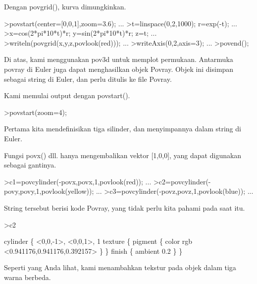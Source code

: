 \documentclass{article}
\begin{document}
\begin{eulernotebook}
\begin{eulercomment}
\begin{eulercomment}
\begin{eulercomment}
\begin{eulercomment}
\begin{eulercomment}
\begin{eulercomment}
\begin{eulercomment}
\begin{eulercomment}
\begin{eulercomment}
\begin{eulercomment}
\begin{eulercomment}
\begin{eulercomment}
\begin{eulercomment}
\begin{eulercomment}
\begin{eulercomment}
\begin{eulercomment}
\begin{eulerprompt}
\end{eulerprompt}
\begin{eulercomment}
Dengan povgrid(), kurva dimungkinkan.
\end{eulercomment}
\begin{eulerprompt}
>povstart(center=[0,0,1],zoom=3.6); ...
>t=linspace(0,2,1000); r=exp(-t); ...
>x=cos(2*pi*10*t)*r; y=sin(2*pi*10*t)*r; z=t; ...
>writeln(povgrid(x,y,z,povlook(red))); ...
>writeAxis(0,2,axis=3); ...
>povend();
\end{eulerprompt}
\begin{eulercomment}
Di atas, kami menggunakan pov3d untuk memplot permukaan. Antarmuka
povray di Euler juga dapat menghasilkan objek Povray. Objek ini
disimpan sebagai string di Euler, dan perlu ditulis ke file Povray.

Kami memulai output dengan povstart().
\end{eulercomment}
\begin{eulerprompt}
>povstart(zoom=4);
\end{eulerprompt}
\begin{eulercomment}
Pertama kita mendefinisikan tiga silinder, dan menyimpannya dalam
string di Euler.

Fungsi povx() dll. hanya mengembalikan vektor [1,0,0], yang dapat
digunakan sebagai gantinya.
\end{eulercomment}
\begin{eulerprompt}
>c1=povcylinder(-povx,povx,1,povlook(red)); ...
>c2=povcylinder(-povy,povy,1,povlook(yellow)); ...
>c3=povcylinder(-povz,povz,1,povlook(blue)); ...
\end{eulerprompt}
\begin{eulercomment}
String tersebut berisi kode Povray, yang tidak perlu kita pahami pada
saat itu.
\end{eulercomment}
\begin{eulerprompt}
>c2
\end{eulerprompt}
\begin{euleroutput}
  cylinder \{ <0,0,-1>, <0,0,1>, 1
   texture \{ pigment \{ color rgb <0.941176,0.941176,0.392157> \}  \} 
   finish \{ ambient 0.2 \} 
   \}
\end{euleroutput}
\begin{eulercomment}
Seperti yang Anda lihat, kami menambahkan tekstur pada objek dalam
tiga warna berbeda.


\end{eulercomment}
\end{eulercomment}
\end{eulercomment}
\end{eulercomment}
\end{eulercomment}
\end{eulercomment}
\end{eulercomment}
\end{eulercomment}
\end{eulercomment}
\end{eulercomment}
\end{eulercomment}
\end{eulercomment}
\end{eulercomment}
\end{eulercomment}
\end{eulercomment}
\end{eulercomment}
\end{eulercomment}
\end{eulernotebook}
\end{document}

